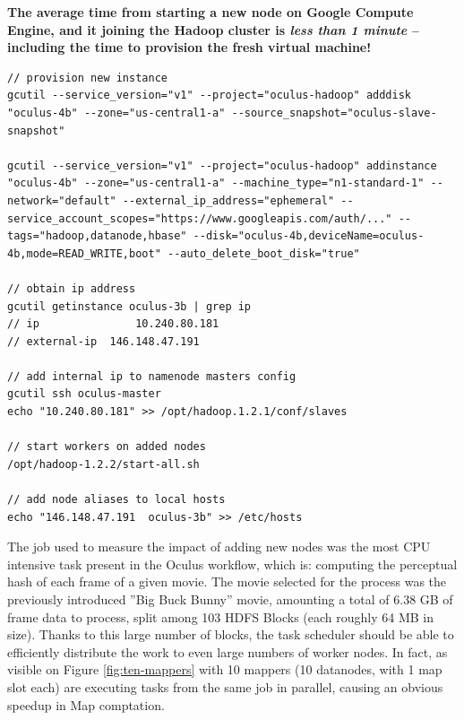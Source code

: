 \textbf{The average time from starting a new node on Google Compute Engine, and it joining the Hadoop cluster is \textit{less than 1 minute} -- including the time to provision the fresh virtual machine!}

\newpage
\begin{lstlisting}[caption={Complete listing of adding a new worker node to the cluster, using GCE}, label={lst:adding-new-node-cluster}]
// provision new instance
gcutil --service_version="v1" --project="oculus-hadoop" adddisk "oculus-4b" --zone="us-central1-a" --source_snapshot="oculus-slave-snapshot"

gcutil --service_version="v1" --project="oculus-hadoop" addinstance "oculus-4b" --zone="us-central1-a" --machine_type="n1-standard-1" --network="default" --external_ip_address="ephemeral" --service_account_scopes="https://www.googleapis.com/auth/..." --tags="hadoop,datanode,hbase" --disk="oculus-4b,deviceName=oculus-4b,mode=READ_WRITE,boot" --auto_delete_boot_disk="true"

// obtain ip address
gcutil getinstance oculus-3b | grep ip
// ip               10.240.80.181
// external-ip  146.148.47.191

// add internal ip to namenode masters config
gcutil ssh oculus-master
echo "10.240.80.181" >> /opt/hadoop.1.2.1/conf/slaves

// start workers on added nodes
/opt/hadoop-1.2.2/start-all.sh

// add node aliases to local hosts
echo "146.148.47.191  oculus-3b" >> /etc/hosts
\end{lstlisting}

The job used to measure the impact of adding new nodes was the most CPU intensive task present in the Oculus workflow, which is: computing the perceptual hash of each frame of a given movie. The movie selected for the process was the previously introduced ''Big Buck Bunny'' movie, amounting a total of 6.38 GB of frame data to process, split among 103 HDFS Blocks (each roughly 64 MB in size). Thanks to this large number of blocks, the task scheduler should be able to efficiently distribute the work to even large numbers of worker nodes. In fact, as visible on Figure \ref{fig:ten-mappers} with 10 mappers (10 datanodes, with 1 map slot each) are executing tasks from the same job in parallel, causing an obvious speedup in Map comptation.


